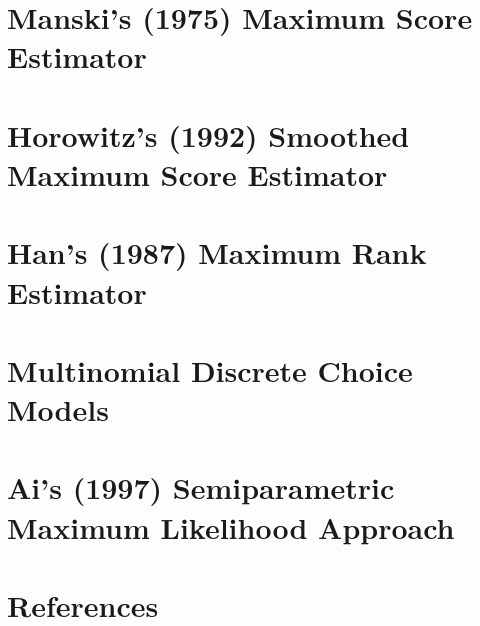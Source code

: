 \documentclass[xcolor=svgnames,dvipdfmx,cjk]{beamer}
\theoremstyle{example}
\begin{document}
\section{Manski's (1975) Maximum Score Estimator}









\section{Horowitz's (1992) Smoothed Maximum Score Estimator}











\section{Han's (1987) Maximum Rank Estimator}










\section{Multinomial Discrete Choice Models}









\section{Ai's (1997) Semiparametric Maximum Likelihood Approach}










\section{References}
\end{document}
